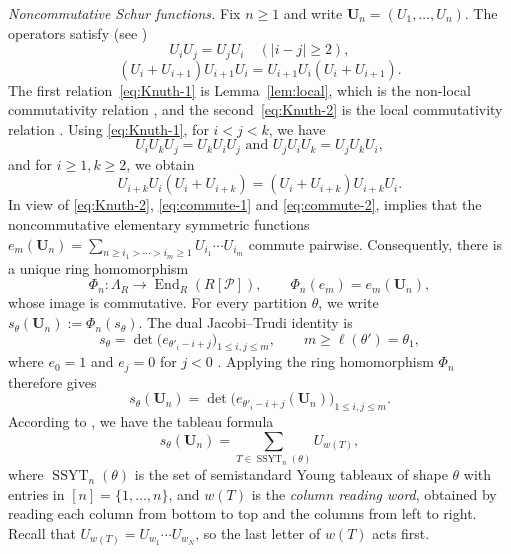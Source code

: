 \documentclass[11pt]{amsart}
\DeclareRobustCommand{\S}{\ensuremath{\mathsection}}
\numberwithin{equation}{section}
\theoremstyle{definition}
\theoremstyle{remark}
\newcommand{\Lam}{\Lambda}
\newcommand{\Par}{\mathcal P}
\newcommand{\SSYT}{\operatorname{SSYT}}
\newcommand{\bfU}{\mathbf U}
\begin{document}
\emph{Noncommutative Schur functions.} Fix $n\geq1$ and write
$\bfU_n=(U_1,\dots,U_n)$. The operators satisfy (see 
\cite[Lemma~3.1]{IMS25})
\begin{equation}
    \label{eq:Knuth-1}
    U_iU_j=U_jU_i\quad(|i-j|\geq2),
\end{equation}
\begin{equation}
    \label{eq:Knuth-2}
    (U_i+U_{i+1})U_{i+1}U_i=U_{i+1}U_i(U_i+U_{i+1}).
\end{equation}
The first relation~\eqref{eq:Knuth-1} is Lemma~\ref{lem:local}, which is
the non-local commutativity relation \cite[\S1, (1.1)]{FominGreene}, and the
second~\eqref{eq:Knuth-2} is the local commutativity relation \cite[\S1, (1.3)]{FominGreene}. Using \eqref{eq:Knuth-1}, for $ i<j<k$, we have
\begin{equation}
    \label{eq:commute-1}
    U_iU_kU_j=U_kU_iU_j \text{ and }
    U_jU_iU_k=U_jU_kU_i,
\end{equation}
and for $i\geq 1,k\geq 2$, we obtain
\begin{equation}
    \label{eq:commute-2}
    U_{i+k}U_i(U_i+U_{i+k})=(U_i+U_{i+k})U_{i+k}U_i.
\end{equation}
In view of \eqref{eq:Knuth-2}, \eqref{eq:commute-1} and \eqref{eq:commute-2}, \cite[Lemma~3.1]{FominGreene} implies that the noncommutative
elementary symmetric functions
$e_m(\bfU_n)=\sum_{n\geq i_1>\cdots>i_m\geq1}U_{i_1}\cdots U_{i_m}$ commute
pairwise. Consequently, there is a unique ring homomorphism
\[
 \Phi_n\colon\Lam_R\longrightarrow\operatorname{End}_R(R[\Par]),
 \qquad \Phi_n(e_m)=e_m(\bfU_n),
\]
whose image is commutative. For every partition $\theta$, we write
$s_\theta(\bfU_n):=\Phi_n(s_\theta)$. The dual Jacobi--Trudi identity is
\[
 s_\theta
 =\det\bigl(e_{\theta'_i-i+j}\bigr)_{1\leq i,j\leq m},
 \qquad m\geq\ell(\theta')=\theta_1,
\]
where $e_0=1$ and $e_j=0$ for $j<0$
\cite[Ch.~I, \S3]{Macdonald}. Applying the ring homomorphism
$\Phi_n$ therefore gives
\[
 s_\theta(\bfU_n)
 =\det\bigl(e_{\theta'_i-i+j}(\bfU_n)\bigr)_{1\leq i,j\leq m}.
\]
According to \cite[Lemma~3.2]{FominGreene}, we have the tableau formula
\begin{equation}\label{eq:FGtableau}
 s_\theta(\bfU_n)=\sum_{T\in\SSYT_n(\theta)}U_{w(T)} ,
\end{equation}
where $\SSYT_n(\theta)$ is the set of semistandard Young tableaux of shape
$\theta$ with entries in $[n]=\{1,\dots,n\}$, and $w(T)$ is the \emph{column
reading word}, obtained by reading each column from bottom to top and the
columns from left to right. Recall that $U_{w(T)}=U_{w_1}\cdots U_{w_N}$, so the
last letter of $w(T)$ acts first.
\end{document}
